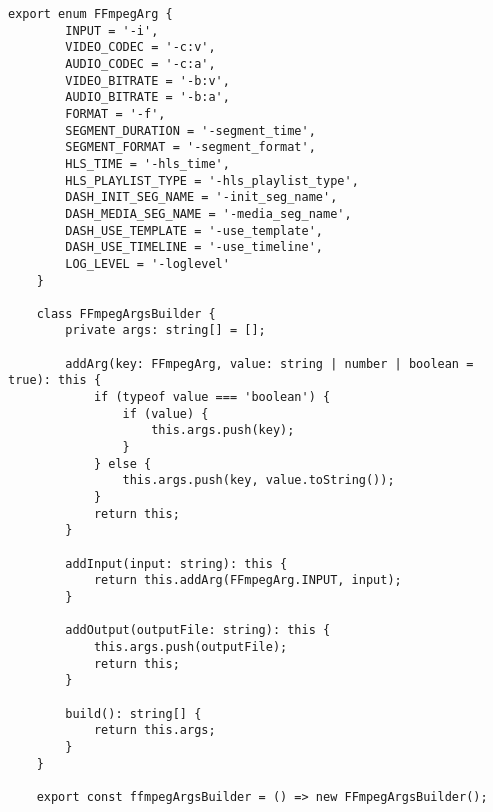 \begin{lstlisting}[caption={ffmpeg-args-builder.service.ts}]
	export enum FFmpegArg {
		INPUT = '-i',
		VIDEO_CODEC = '-c:v',
		AUDIO_CODEC = '-c:a',
		VIDEO_BITRATE = '-b:v',
		AUDIO_BITRATE = '-b:a',
		FORMAT = '-f',
		SEGMENT_DURATION = '-segment_time',
		SEGMENT_FORMAT = '-segment_format',
		HLS_TIME = '-hls_time',
		HLS_PLAYLIST_TYPE = '-hls_playlist_type',
		DASH_INIT_SEG_NAME = '-init_seg_name',
		DASH_MEDIA_SEG_NAME = '-media_seg_name',
		DASH_USE_TEMPLATE = '-use_template',
		DASH_USE_TIMELINE = '-use_timeline',
		LOG_LEVEL = '-loglevel'
	}
	
	class FFmpegArgsBuilder {
		private args: string[] = [];
		
		addArg(key: FFmpegArg, value: string | number | boolean = true): this {
			if (typeof value === 'boolean') {
				if (value) {
					this.args.push(key);
				}
			} else {
				this.args.push(key, value.toString());
			}
			return this;
		}
		
		addInput(input: string): this {
			return this.addArg(FFmpegArg.INPUT, input);
		}
		
		addOutput(outputFile: string): this {
			this.args.push(outputFile);
			return this;
		}
		
		build(): string[] {
			return this.args;
		}
	}
	
	export const ffmpegArgsBuilder = () => new FFmpegArgsBuilder();
\end{lstlisting}

